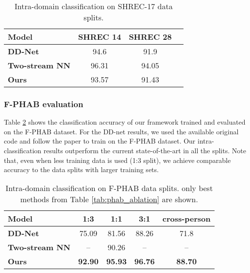 \documentclass[letterpaper, 10 pt, conference]{ieeeconf}
\begin{document}
\begin{table}[ht]
\centering
\begin{tabular}{|l|c|c|c|}
\hline
\textbf{Model} & \textbf{SHREC 14} & \textbf{SHREC 28} \\ \hline
\textbf{DD-Net \cite{yang2019make}} & 94.6 & 91.9 \\ \hline
\textbf{Two-stream NN \cite{li2021two}} & 96.31 & 94.05 \\ \hline
\textbf{Ours} & 93.57 & 91.43 \\ \hline
\end{tabular}
\caption{Intra-domain classification on SHREC-17 data splits.}
\label{tab:shrec_bench}
\end{table}




\subsubsection{F-PHAB evaluation}

Table \ref{tab:fphab_bench} shows the classification accuracy of our framework trained and evaluated on the F-PHAB dataset. For the DD-net results, we used the available original code and follow the paper to train on the F-PHAB dataset. 
Our intra-classification results outperform the current state-of-the-art in all the splits.
Note that, even when less training data is used (1:3 split), we achieve comparable accuracy to the data splits with larger training sets. 



\begin{table}[ht]
\centering
\begin{tabular}{|l|c|c|c|c|}
\hline
\textbf{Model} & \textbf{1:3} & \textbf{1:1} & \textbf{3:1} & \textbf{cross-person} \\ \hline
\textbf{DD-Net \cite{yang2019make}} & 75.09 & 81.56 & 88.26 & 71.8 \\ \hline \textbf{Two-stream NN \cite{li2021two}} & -- & 90.26 & -- & -- \\ \hline \textbf{Ours} & \textbf{92.90} & \textbf{95.93} & \textbf{96.76} & \textbf{88.70} \\ \hline
\end{tabular}
\caption{Intra-domain classification on F-PHAB data splits. only best methods from Table  \ref{tab:phab_ablation} are shown.}
\label{tab:fphab_bench}
\end{table}
\end{document}
